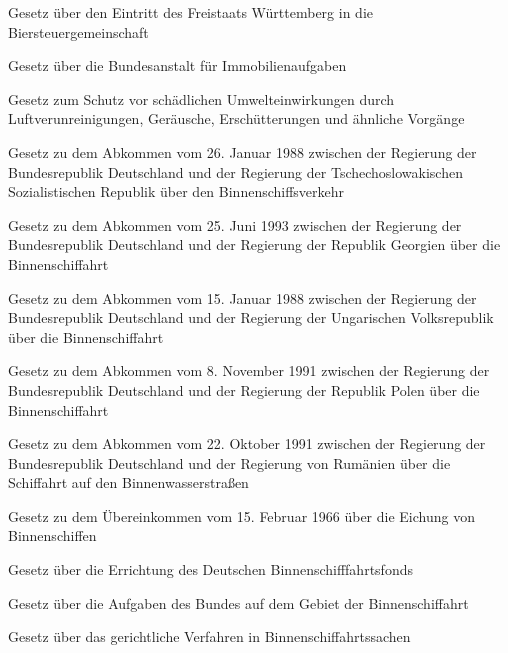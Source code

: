 \item[{BierStGemWÜG}] Gesetz über den Eintritt des Freistaats Württemberg in die Biersteuergemeinschaft

\item[{BImAG}] Gesetz über die Bundesanstalt für Immobilienaufgaben

\item[{BImSchG}] Gesetz zum Schutz vor schädlichen Umwelteinwirkungen durch Luftverunreinigungen, Geräusche, Erschütterungen und ähnliche Vorgänge

\item[{BinSchAbkCSKG}] Gesetz zu dem Abkommen vom 26. Januar 1988 zwischen der Regierung der Bundesrepublik Deutschland und der Regierung der Tschechoslowakischen Sozialistischen Republik über den Binnenschiffsverkehr

\item[{BinSchAbkGEORG}] Gesetz zu dem Abkommen vom 25. Juni 1993 zwischen der Regierung der Bundesrepublik Deutschland und der Regierung der Republik Georgien über die Binnenschiffahrt

\item[{BinSchAbkHUNG}] Gesetz zu dem Abkommen vom 15. Januar 1988 zwischen der Regierung der Bundesrepublik Deutschland und der Regierung der Ungarischen Volksrepublik über die Binnenschiffahrt

\item[{BinSchAbkPOLG}] Gesetz zu dem Abkommen vom 8. November 1991 zwischen der Regierung der Bundesrepublik Deutschland und der Regierung der Republik Polen über die Binnenschiffahrt

\item[{BinSchAbkROMG}] Gesetz zu dem Abkommen vom 22. Oktober 1991 zwischen der Regierung der Bundesrepublik Deutschland und der Regierung von Rumänien über die Schiffahrt auf den Binnenwasserstraßen

\item[{BinSchEÜbkG}] Gesetz zu dem Übereinkommen vom 15. Februar 1966 über die Eichung von Binnenschiffen

\item[{BinSchFondsG}] Gesetz über die Errichtung des Deutschen Binnenschifffahrtsfonds

\item[{BinSchG}] Gesetz über die Aufgaben des Bundes auf dem Gebiet der Binnenschiffahrt

\item[{BinSchGerG}] Gesetz über das gerichtliche Verfahren in Binnenschiffahrtssachen

